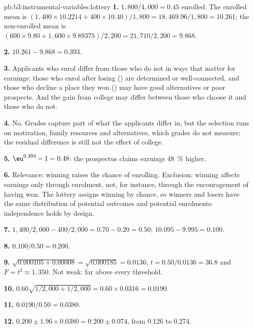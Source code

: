 \begin{solution}{pb:b3:instrumental-variables:lottery}
\textbf{1.} $1{,}800/4{,}000 = 0.45$ enrolled. The enrolled mean is
$(1{,}400 \times 10.2214 + 400 \times 10.40)/1{,}800 = 18{,}469.96/1{,}800 =
10.261$; the non-enrolled mean is $(600 \times 9.80 + 1{,}600 \times
9.89375)/2{,}200 = 21{,}710/2{,}200 = 9.868$.

\textbf{2.} $10.261 - 9.868 = 0.393$.

\textbf{3.} Applicants who enrol differ from those who do not in ways that
matter for earnings: those who enrol after losing () are
determined or well-connected, and those who decline a place they won
() may have good alternatives or poor prospects. And the gain from
college may differ between those who choose it and those who do not.

\textbf{4.} No. Grades capture part of what the applicants differ in, but the
selection runs on motivation, family resources and alternatives, which grades
do not measure; the residual difference is still not the effect of college.

\textbf{5.} $\eu^{0.393} - 1 = 0.48$: the prospectus claims earnings 48~\%
higher.

\textbf{6.} Relevance: winning raises the chance of enrolling. Exclusion:
winning affects earnings only through enrolment, not, for instance, through
the encouragement of having won. The lottery assigns winning by chance, so
winners and losers have the same distribution of potential outcomes and
potential enrolments: independence holds by design.

\textbf{7.}  $1{,}400/2{,}000 - 400/2{,}000 = 0.70 - 0.20 = 0.50$;
 $10.095 - 9.995 = 0.100$.

\textbf{8.} $0.100/0.50 = 0.200$.

\textbf{9.} $\sqrt{0.000105 + 0.00008} = \sqrt{0.000185} = 0.0136$; $t =
0.50/0.0136 = 36.8$ and $F = t^2 \approx 1{,}350$. Not weak: far above every
threshold.

\textbf{10.} $0.60 \sqrt{1/2{,}000 + 1/2{,}000} = 0.60 \times 0.0316 = 0.0190$.

\textbf{11.} $0.0190/0.50 = 0.0380$.

\textbf{12.} $0.200 \pm 1.96 \times 0.0380 = 0.200 \pm 0.074$, from 0.126 to
0.274.


\end{solution}
